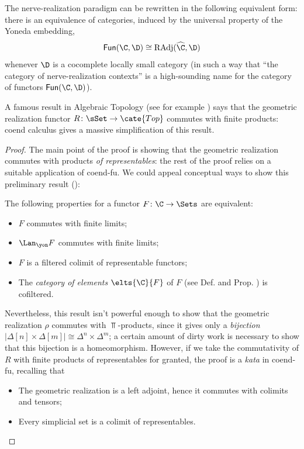 \begin{remark}
The nerve\hyp{}realization paradigm can be rewritten in the following equivalent form: there is an equivalence of categories, induced by the universal property of the Yoneda embedding, 
\[
\textsf{Fun}(\C, \D)\cong \text{RAdj}(\widehat{\C}, \D)
\]
whenever $\D$ is a cocomplete locally small category (in such a way that ``the category of nerve\hyp{}realization contexts'' is a high-sounding name for the category of functors $\textsf{Fun}(\C, \D)$).
\end{remark}
A famous result in Algebraic Topology (see for example \cite{GZ, GoJ}) says that the geometric realization functor $R\colon \sSet\to\cate{Top}$ commutes with finite products: coend calculus gives a massive simplification of this result.
\begin{proof}
The main point of the proof is showing that the geometric realization commutes with products \emph{of representables}: the rest of the proof relies on a suitable application of coend-fu. We could appeal conceptual ways to show this preliminary result (\cite[\S \textbf{2}]{adamek2002classification}):
\begin{proposition}\label{cofiltness}
The following properties for a functor $F\colon \C\to \Sets$ are equivalent:
\begin{itemize}
\item $F$ commutes with finite limits;
\item $\Lan_\yon F$ commutes with finite limits;
\item $F$ is a filtered colimit of representable functors;
\item The \emph{category of elements} $\elts{\C}{F}$ of $F$ (see Def\@.  and Prop\@. ) is cofiltered.
\end{itemize}
\end{proposition}
Nevertheless, this result isn't powerful enough to show that the geometric realization $\rho$ commutes with $\Top$-products, since it gives only a \emph{bijection} $|\Delta[n]\times \Delta[m]|\cong \Delta^n \times \Delta^m$; a certain amount of dirty work is necessary to show that this bijection is a homeomorphism. However, if we take the commutativity of $R$ with finite products of representables for granted, the proof is a \emph{kata} in coend-fu, recalling that
\begin{itemize}
\item The geometric realization is a left adjoint, hence it commutes with colimits and tensors;
\item Every simplicial set is a colimit of representables.

\end{itemize}
\end{proof}
